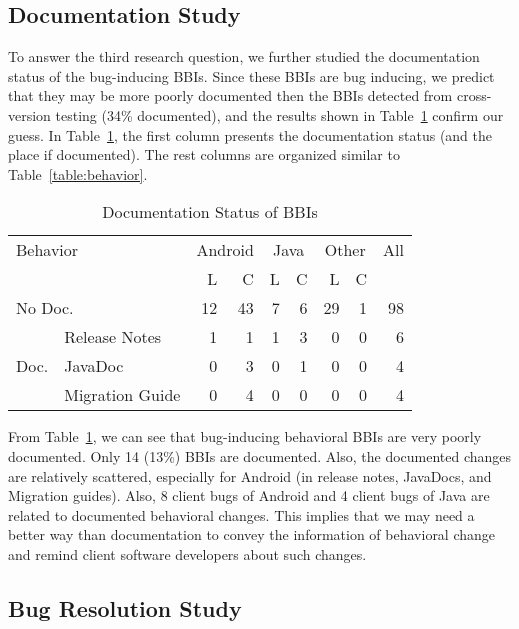 \subsection{Documentation Study}
\label{subsubsec:docIncomp}
To answer the third research question, we further studied the documentation status of the bug-inducing BBIs. Since these BBIs are bug inducing, we predict that they may be more poorly documented then the BBIs detected from cross-version testing (34\% documented), and the results shown in Table~\ref{table:documentation} confirm our guess. In Table~\ref{table:documentation}, the first column presents the documentation status (and the place if documented). The rest columns are organized similar to Table~\ref{table:behavior}. 

\begin{table}
	\center
	\caption{\label{table:documentation} Documentation Status of BBIs}
	\begin{tabular}{|l|l|r|r|r|r|r|r|r|}
		\hline
		\multicolumn{2}{|l|}{Behavior} & \multicolumn{2}{|c|}{Android} & \multicolumn{2}{|c|}{Java} & \multicolumn{2}{|c|}{Other} & All\\
		\cline{3-8}
		\multicolumn{2}{|l|}{}      & L & C & L & C & L & C& \\
		\hline
		\multicolumn{2}{|l|}{No Doc.} &12&43&7&6&  29&  1  & 98  \\
		\hline
		\multirow{3}{*}{Doc.}&Release Notes &1   & 1&1&3& 0 &  0 & 6  \\
		&JavaDoc       & 0  &  3 &0&1& 0 &   0  & 4  \\
		&Migration Guide &  0  & 4   &0&0& 0& 0  &  4  \\
		\hline 
	\end{tabular}
	\vspace{+0.3cm}	
\end{table}

From Table~\ref{table:documentation}, we can see that bug-inducing behavioral BBIs are very poorly documented. Only 14 (13\%) BBIs are documented.  Also, the documented changes are relatively scattered, especially for Android (in release notes, JavaDocs, and Migration guides). Also, 8 client bugs of Android and 4 client bugs of Java are related to documented behavioral changes. This implies that we may need a better way than documentation to convey the information of behavioral change and remind client software developers about such changes. 
		
\subsection{Bug Resolution Study}
		

